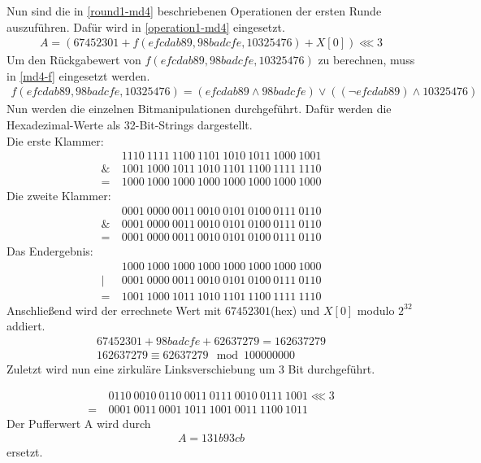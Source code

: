 \documentclass[12pt,a4paper]{scrartcl}
\numberwithin{equation}{section}
\numberwithin{myalgctr}{section}
\numberwithin{mytheoremctr}{section}
\newcommand*\BitAnd{\mathrel{\&}}
\newcommand*\BitOr{\mathrel{|}}
\begin{document}
	Nun sind die in \cref{round1-md4} beschriebenen Operationen der ersten Runde auszuführen. Dafür wird in \eqref{operation1-md4} eingesetzt.
	\begin{align*}
	A = (67452301 + f(efcdab89, 98badcfe, 10325476) + X[0])\lll 3
	\end{align*}
	Um den Rückgabewert von $f(efcdab89, 98badcfe, 10325476)$ zu berechnen, muss in \eqref{md4-f} eingesetzt werden.
	\begin{align*}
		f(efcdab89, 98badcfe, 10325476) = (efcdab89\wedge 98badcfe) \vee ((\neg efcdab89)\wedge 10325476)		
	\end{align*}
	Nun  werden die einzelnen Bitmanipulationen durchgeführt. Dafür werden die Hexadezimal-Werte als 32-Bit-Strings dargestellt.\\
	Die erste Klammer:
	\begin{align*}
		&1110~1111~1100~1101~1010~1011~1000~1001\\
	\BitAnd~&1001~1000~1011~1010~1101~1100~1111~1110\\
		=~&1000~1000~1000~1000~1000~1000~1000~1000
	\end{align*}
	Die zweite Klammer:
	\begin{align*}
		&0001~0000~0011~0010~0101~0100~0111~0110\\
	\BitAnd~&0001~0000~0011~0010~0101~0100~0111~0110\\
		=~&0001~0000~0011~0010~0101~0100~0111~0110
	\end{align*}
	Das Endergebnis:
	\begin{align*}
		&1000~1000~1000~1000~1000~1000~1000~1000\\
	 \BitOr~&0001~0000~0011~0010~0101~0100~0111~0110\\
		=~&1001~1000~1011~1010~1101~1100~1111~1110
	\end{align*}
	\noindent
	Anschließend wird der errechnete Wert mit $67452301$(hex) und $X[0]$ modulo $2^{32}$ addiert.
	\begin{align*}
	67452301 + 98badcfe + 62637279 = 162637279\\
	162637279 \equiv 62637279\mod 100000000
	\end{align*}
	\noindent
	Zuletzt wird nun eine zirkuläre Linksverschiebung um 3 Bit durchgeführt.
	
	\begin{align*}
	&0110~0010~0110~0011~0111~0010~0111~1001\lll 3\\
	=~&0001~0011~0001~1011~1001~0011~1100~1011
	\end{align*}
	\noindent
	Der Pufferwert A wird durch 
	\begin{align*}
		A = 131b93cb
	\end{align*}
	ersetzt.
	
\end{document}
